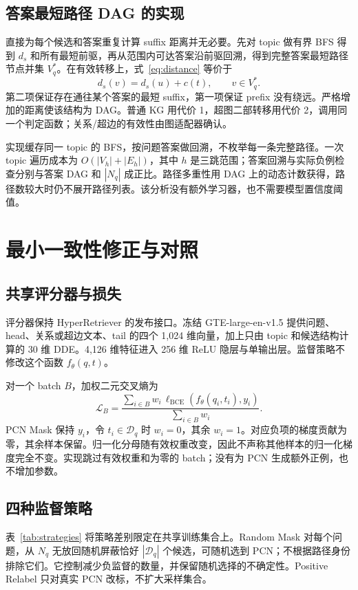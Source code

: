 \documentclass[UTF8,a4paper,10pt,fontset=fandol]{ctexart}
\newcommand{\pcn}{\mathcal D_q}
\begin{document}
\subsection{答案最短路径 DAG 的实现}
直接为每个候选和答案重复计算 suffix 距离并无必要。先对 topic 做有界 BFS 得到 $d_s$ 和所有最短前驱，再从范围内可达答案沿前驱回溯，得到完整答案最短路径节点并集 $V_q^*$。在有效转移上，式~\eqref{eq:distance} 等价于
\begin{equation}
d_s(v)=d_s(u)+c(t),\qquad v\in V_q^*.
\label{eq:dag}
\end{equation}
第二项保证存在通往某个答案的最短 suffix，第一项保证 prefix 没有绕远。严格增加的距离使该结构为 DAG。普通 KG 用代价 1，超图二部转移用代价 2，调用同一个判定函数；关系/超边的有效性由图适配器确认。

实现缓存同一 topic 的 BFS，按问题答案做回溯，不枚举每一条完整路径。一次 topic 遍历成本为 $O(|V_h|+|E_h|)$，其中 $h$ 是三跳范围；答案回溯与实际负例检查分别与答案 DAG 和 $|N_q|$ 成正比。路径多重性用 DAG 上的动态计数获得，路径数较大时仍不展开路径列表。该分析没有额外学习器，也不需要模型置信度阈值。

\section{最小一致性修正与对照}
\subsection{共享评分器与损失}
评分器保持 HyperRetriever 的发布接口\cite{hyperrag}。冻结 GTE-large-en-v1.5 提供问题、head、关系或超边文本、tail 的四个 1,024 维向量，加上只由 topic 和候选结构计算的 30 维 DDE。4,126 维特征进入 256 维 ReLU 隐层与单输出层。监督策略不修改这个函数 $f_\theta(q,t)$。

对一个 batch $B$，加权二元交叉熵为
\begin{equation}
\mathcal L_B=\frac{\sum_{i\in B}w_i\,\ell_{\mathrm{BCE}}(f_\theta(q_i,t_i),y_i)}{\sum_{i\in B}w_i}.
\label{eq:loss}
\end{equation}
PCN Mask 保持 $y_i$，令 $t_i\in\pcn$ 时 $w_i=0$，其余 $w_i=1$。对应负项的梯度贡献为零，其余样本保留。归一化分母随有效权重改变，因此不声称其他样本的归一化梯度完全不变。实现跳过有效权重和为零的 batch；没有为 PCN 生成额外正例，也不增加参数。

\subsection{四种监督策略}
表~\ref{tab:strategies} 将策略差别限定在共享训练集合上。Random Mask 对每个问题，从 $N_q$ 无放回随机屏蔽恰好 $|\pcn|$ 个候选，可随机选到 PCN；不根据路径身份排除它们。它控制减少负监督的数量，并保留随机选择的不确定性。Positive Relabel 只对真实 PCN 改标，不扩大采样集合。
\end{document}
